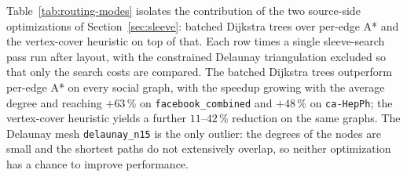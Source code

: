 Table~\ref{tab:routing-modes} isolates the contribution of the two
source-side optimizations of Section~\ref{sec:sleeve}: batched
Dijkstra trees over per-edge A* and the vertex-cover heuristic on top
of that.  Each row times a single sleeve-search pass run after layout,
with the constrained Delaunay triangulation excluded so that only the
search costs are compared. The batched Dijkstra trees outperform
per-edge A* on every social graph, with the speedup growing with the
average degree and reaching $+63$\,\% on \texttt{facebook\_combined}
and $+48$\,\% on \texttt{ca-HepPh}; the vertex-cover heuristic yields
a further $11$--$42$\,\% reduction on the same graphs. The Delaunay
mesh \texttt{delaunay\_n15} is the only outlier: the degrees of the
nodes are small and the shortest paths do not extensively overlap,
so neither optimization has a chance to improve performance.

